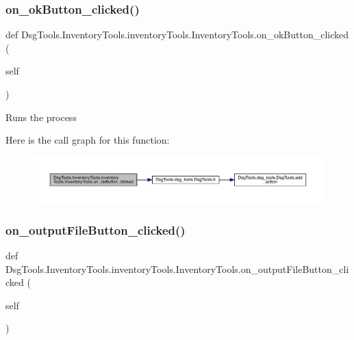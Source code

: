 \subsubsection{\texorpdfstring{on\+\_\+ok\+Button\+\_\+clicked()}{on\_okButton\_clicked()}}
{\footnotesize\ttfamily def Dsg\+Tools.\+Inventory\+Tools.\+inventory\+Tools.\+Inventory\+Tools.\+on\+\_\+ok\+Button\+\_\+clicked (\begin{DoxyParamCaption}\item[{}]{self }\end{DoxyParamCaption})}

\begin{DoxyVerb}Runs the process
\end{DoxyVerb}
 Here is the call graph for this function\+:
\nopagebreak
\begin{figure}[H]
\begin{center}
\leavevmode
\includegraphics[width=350pt]{class_dsg_tools_1_1_inventory_tools_1_1inventory_tools_1_1_inventory_tools_ab6686746678e39bdf6d5e28713dcdd66_cgraph}
\end{center}
\end{figure}
\mbox{\label{class_dsg_tools_1_1_inventory_tools_1_1inventory_tools_1_1_inventory_tools_a59555f35e462d65997feb8394e97d6aa}} 
\subsubsection{\texorpdfstring{on\+\_\+output\+File\+Button\+\_\+clicked()}{on\_outputFileButton\_clicked()}}
{\footnotesize\ttfamily def Dsg\+Tools.\+Inventory\+Tools.\+inventory\+Tools.\+Inventory\+Tools.\+on\+\_\+output\+File\+Button\+\_\+clicked (\begin{DoxyParamCaption}\item[{}]{self }\end{DoxyParamCaption})}

